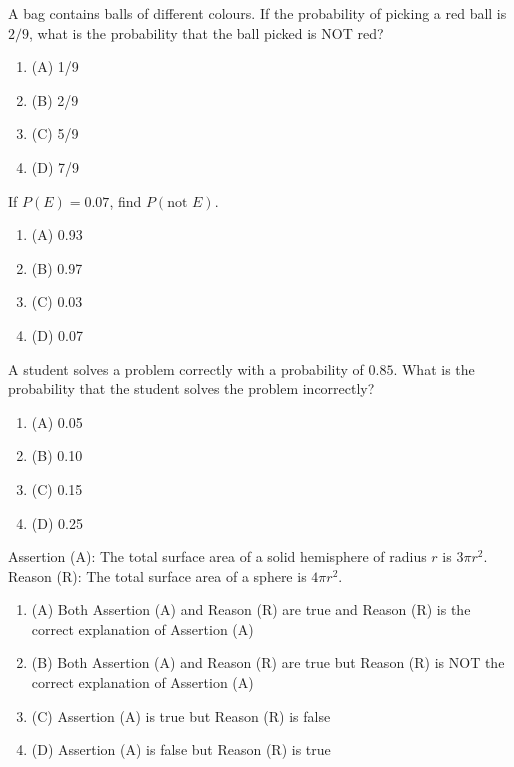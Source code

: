 \documentclass[12pt,a4paper]{exam}
\begin{document}
\begin{questions}
\question[1] A bag contains balls of different colours. If the probability of picking a red ball is $2/9$, what is the probability that the ball picked is NOT red?
\begin{enumerate}[label=(\Alph*)]
  \item (A) 1/9
  \item (B) 2/9
  \item (C) 5/9
  \item (D) 7/9
\end{enumerate}
\vspace{0.15cm}

\question[1] If $P(E) = 0.07$, find $P(\text{not } E)$.
\begin{enumerate}[label=(\Alph*)]
  \item (A) 0.93
  \item (B) 0.97
  \item (C) 0.03
  \item (D) 0.07
\end{enumerate}
\vspace{0.15cm}

\question[1] A student solves a problem correctly with a probability of $0.85$. What is the probability that the student solves the problem incorrectly?
\begin{enumerate}[label=(\Alph*)]
  \item (A) 0.05
  \item (B) 0.10
  \item (C) 0.15
  \item (D) 0.25
\end{enumerate}
\vspace{0.15cm}

\question[1] Assertion (A): The total surface area of a solid hemisphere of radius $r$ is $3\pi r^2$. Reason (R): The total surface area of a sphere is $4\pi r^2$.
\begin{enumerate}[label=(\Alph*)]
  \item (A) Both Assertion (A) and Reason (R) are true and Reason (R) is the correct explanation of Assertion (A)
  \item (B) Both Assertion (A) and Reason (R) are true but Reason (R) is NOT the correct explanation of Assertion (A)
  \item (C) Assertion (A) is true but Reason (R) is false
  \item (D) Assertion (A) is false but Reason (R) is true
\end{enumerate}
\vspace{0.15cm}


\end{questions}
\end{document}
